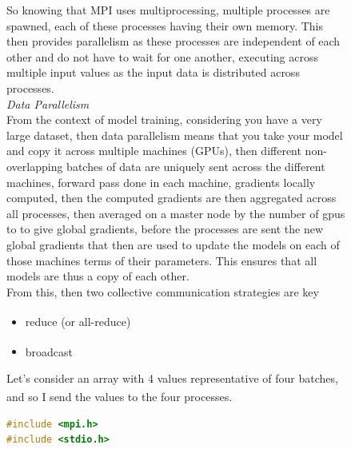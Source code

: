 \documentclass[12pt]{article}
\newcommand{\customtext}[3]{%
    \vspace{#2} %
    \fontsize{13}{8}\textcolor{#1}{\textit{#3}}%
}
\newcommand{\sidecite}[1]{\textsuperscript{\textcolor{blue}{\textbf{\scriptsize#1}}}}
\newcommand{\maincitecount}{\sidecite{\stepcounter{maincite}\themaincite}}
\begin{document}
\begin{figure}[!htb]
    \begin{minipage}[t]{0.65\textwidth}
    \raggedright
    So knowing that MPI uses multiprocessing, multiple processes are spawned, each of these processes 
    having their own memory. This then provides parallelism as these processes are independent of each 
    other and do not have to wait for one another, executing across multiple input values as the input 
    data is distributed across processes.\\
    \vspace{1em}
    \customtext{xtitle}{0em}{Data Parallelism}\\
    From the context of model training, considering you have a very large dataset, then 
    data parallelism means that you take your model and copy it across multiple machines (GPUs),
    then different non-overlapping batches of data are uniquely sent across the different 
    machines, forward pass done in each machine, gradients locally computed, then the 
    computed gradients are then aggregated across all processes, then averaged on a master node 
    by the number of gpus to to give global gradients, before the processes are sent the new 
    global gradients that then are used to update the models on each of those machines terms 
    of their parameters. This ensures that all models are thus a copy of each other.\\
    From this, then two collective  communication strategies are key 
    \begin{itemize}[left=0pt,topsep=0pt,itemsep=0ex,parsep=0ex]
        \item reduce (or all-reduce) \maincitecount
        \item broadcast \maincitecount
    \end{itemize}
    Let's consider an array with 4 values representative of four batches, and so 
    I send the values to the four processes\maincitecount.
\begin{lstlisting}[language=c,style=c,basicstyle=\ttfamily\footnotesize]
#include <mpi.h>
#include <stdio.h>


\end{lstlisting}
\end{minipage}
\end{figure}
\end{document}
